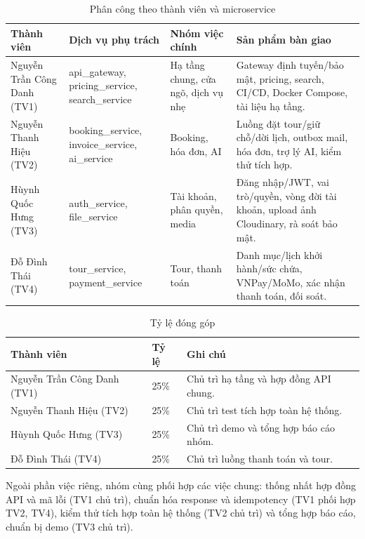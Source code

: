 \begin{table}[H]
\centering
\caption{Phân công theo thành viên và microservice}
\label{tab:phan-cong-nhom}
\small
\begin{tabularx}{\textwidth}{@{}L{2.0cm}L{2.6cm}L{3.1cm}Y@{}}
\toprule
\textbf{Thành viên} & \textbf{Dịch vụ phụ trách} & \textbf{Nhóm việc chính} & \textbf{Sản phẩm bàn giao}\\
\midrule
Nguyễn Trần Công Danh (TV1) & api\_gateway, pricing\_service, search\_service & Hạ tầng chung, cửa ngõ, dịch vụ nhẹ & Gateway định tuyến/bảo mật, pricing, search, CI/CD, Docker Compose, tài liệu hạ tầng.\\
Nguyễn Thanh Hiệu (TV2) & booking\_service, invoice\_service, ai\_service & Booking, hóa đơn, AI & Luồng đặt tour/giữ chỗ/dời lịch, outbox mail, hóa đơn, trợ lý AI, kiểm thử tích hợp.\\
Hùynh Quốc Hưng (TV3) & auth\_service, file\_service & Tài khoản, phân quyền, media & Đăng nhập/JWT, vai trò/quyền, vòng đời tài khoản, upload ảnh Cloudinary, rà soát bảo mật.\\
Đỗ Đình Thái (TV4) & tour\_service, payment\_service & Tour, thanh toán & Danh mục/lịch khởi hành/sức chứa, VNPay/MoMo, xác nhận thanh toán, đối soát.\\
\bottomrule
\end{tabularx}
\end{table}

\begin{table}[H]
\centering
\caption{Tỷ lệ đóng góp}
\label{tab:ty-le-dong-gop}
\small
\begin{tabularx}{\textwidth}{@{}L{5.4cm}C{2.6cm}Y@{}}
\toprule
\textbf{Thành viên} & \textbf{Tỷ lệ} & \textbf{Ghi chú}\\
\midrule
Nguyễn Trần Công Danh (TV1) & 25\% & Chủ trì hạ tầng và hợp đồng API chung.\\
Nguyễn Thanh Hiệu (TV2) & 25\% & Chủ trì test tích hợp toàn hệ thống.\\
Hùynh Quốc Hưng (TV3) & 25\% & Chủ trì demo và tổng hợp báo cáo nhóm.\\
Đỗ Đình Thái (TV4) & 25\% & Chủ trì luồng thanh toán và tour.\\
\bottomrule
\end{tabularx}
\end{table}

Ngoài phần việc riêng, nhóm cùng phối hợp các việc chung: thống nhất hợp đồng API và mã lỗi (TV1 chủ trì), chuẩn hóa response và idempotency (TV1 phối hợp TV2, TV4), kiểm thử tích hợp toàn hệ thống (TV2 chủ trì) và tổng hợp báo cáo, chuẩn bị demo (TV3 chủ trì).

